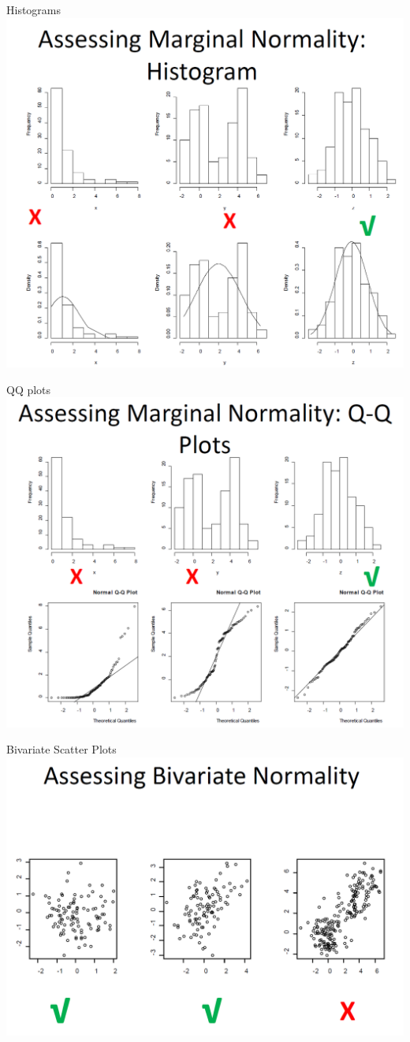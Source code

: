 \documentclass[
  ignorenonframetext,
]{beamer}
\begin{document}
\begin{frame}{Histograms}
\protect\hypertarget{histograms}{}
\includegraphics[width=0.6\linewidth]{img/assess_hist}
\end{frame}

\begin{frame}{QQ plots}
\protect\hypertarget{qq-plots}{}
\includegraphics[width=0.6\linewidth]{img/assess_qq}
\end{frame}

\begin{frame}{Bivariate Scatter Plots}
\protect\hypertarget{bivariate-scatter-plots}{}
\includegraphics[width=0.6\linewidth]{img/assess_binorm}
\end{frame}
\end{document}

